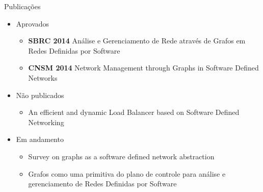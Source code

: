 \begin{frame}{Publicações}

    \begin{itemize}
        \item Aprovados
            \begin{itemize}
        \item \textbf{SBRC 2014} Análise e Gerenciamento de Rede através de 
            Grafos em Redes Definidas por Software
        \item \textbf{CNSM 2014} Network Management through Graphs in 
            Software Defined Networks
    \end{itemize}
    \end{itemize}

    \begin{itemize}
        \item Não publicados
    \begin{itemize}
        \item An efficient and dynamic Load Balancer based on 
            Software Defined Networking
    \end{itemize}
    \end{itemize}

    \begin{itemize}
        \item Em andamento
            \begin{itemize}
        \item Survey on graphs as a software defined network abstraction
        \item Grafos como uma primitiva do plano de controle para análise e 
            gerenciamento de Redes Definidas por Software
    \end{itemize}
    \end{itemize}
\end{frame}



